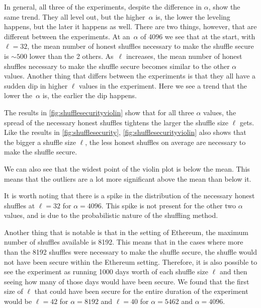 In general, all three of the experiments, despite the difference in $\alpha$, show the same trend.
They all level out, but the higher~$\alpha$ is, the lower the leveling happens, but the later it happens as well.
There are two things, however, that are different between the experiments.
At an~$\alpha$ of 4096 we see that at the start, with $\ell=32$, the mean number of honest shuffles necessary to make the shuffle secure is $\sim 500$ lower than the 2 others.
As~$\ell$ increases, the mean number of honest shuffles necessary to make the shuffle secure becomes similar to the other $\alpha$ values.
Another thing that differs between the experiments is that they all have a sudden dip in higher $\ell$ values in the experiment.
Here we see a trend that the lower the~$\alpha$ is, the earlier the dip happens.



The results in \autoref{fig:shufflesecurityviolin} show that for all three $\alpha$ values, the spread of the necessary honest shuffles tightens the larger the shuffle size $\ell$ gets.
Like the results in \autoref{fig:shufflesecurity}, \autoref{fig:shufflesecurityviolin} also shows that the bigger a shuffle size $\ell$, the less honest shuffles on average are necessary to make the shuffle secure.

We can also see that the widest point of the violin plot is below the mean.
This means that the outliers are a lot more significant above the mean than below it.

It is worth noting that there is a spike in the distribution of the necessary honest shuffles at $\ell=32$ for $\alpha=4096$.
This spike is not present for the other two $\alpha$ values, and is due to the probabilistic nature of the shuffling method.

Another thing that is notable is that in the setting of Ethereum, the maximum number of shuffles available is 8192.
This means that in the cases where more than the 8192 shuffles were necessary to make the shuffle secure, the shuffle would not have been secure within the Ethereum setting.
Therefore, it is also possible to see the experiment as running 1000 days worth of each shuffle size $\ell$ and then seeing how many of those days would have been secure.
We found that the first size of $\ell$ that could have been secure for the entire duration of the experiment would be $\ell=42$ for $\alpha=8192$ and $\ell=40$ for $\alpha=5462$ and $\alpha=4096$.


